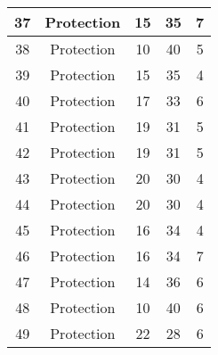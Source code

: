 \documentclass[results.tex]{subfiles}
\begin{document}
\begin{center}
\begin{tabular}{| c || c | c | c | c |}
            \hline
            37                      & Protection                   & 15                     & 35                      & 7                    \\
            \hline
            38                      & Protection                   & 10                     & 40                      & 5                    \\
            \hline
            39                      & Protection                   & 15                     & 35                      & 4                    \\
            \hline
            40                      & Protection                   & 17                     & 33                      & 6                    \\
            \hline
            41                      & Protection                   & 19                     & 31                      & 5                    \\
            \hline
            42                      & Protection                   & 19                     & 31                      & 5                    \\
            \hline
            43                      & Protection                   & 20                     & 30                      & 4                    \\
            \hline
            44                      & Protection                   & 20                     & 30                      & 4                    \\
            \hline
            45                      & Protection                   & 16                     & 34                      & 4                    \\
            \hline
            46                      & Protection                   & 16                     & 34                      & 7                    \\
            \hline
            47                      & Protection                   & 14                     & 36                      & 6                    \\
            \hline
            48                      & Protection                   & 10                     & 40                      & 6                    \\
            \hline
            49                      & Protection                   & 22                     & 28                      & 6                    \\
            \hline
        \end{tabular}
    \end{center}
\end{document}
